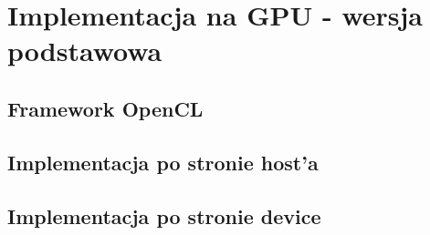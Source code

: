 
\section { Implementacja na GPU - wersja podstawowa }

\subsection{ Framework OpenCL }

\subsection{ Implementacja po stronie host'a }


\subsection{ Implementacja po stronie device }